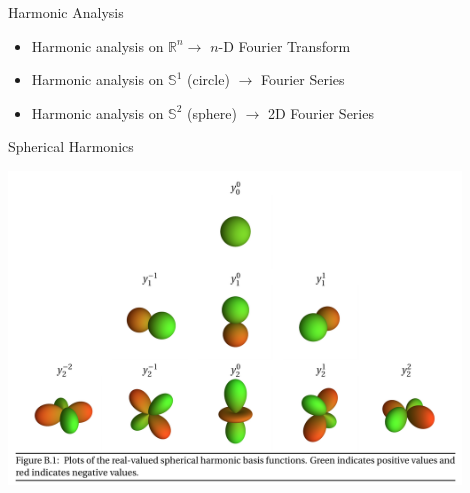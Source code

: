 \documentclass[presentation]{beamer}
\begin{document}
\begin{frame}[label=sec-5]{Harmonic Analysis}
\begin{itemize}
\item Harmonic analysis on $\mathbb{R}^n \rightarrow$ $n$-D Fourier Transform\\
\item Harmonic analysis on $\mathbb{S}^1$ (circle) $\rightarrow$ Fourier Series\\
\item Harmonic analysis on $\mathbb{S}^2$ (sphere) $\rightarrow$ 2D Fourier Series
\end{itemize}
\end{frame}
\begin{frame}[label=sec-6]{Spherical Harmonics}
\begin{center}
  \includegraphics[width=0.9\textwidth, interpolate=true]{figs/harmonics.png}
\end{center}
\end{frame}
\end{document}
